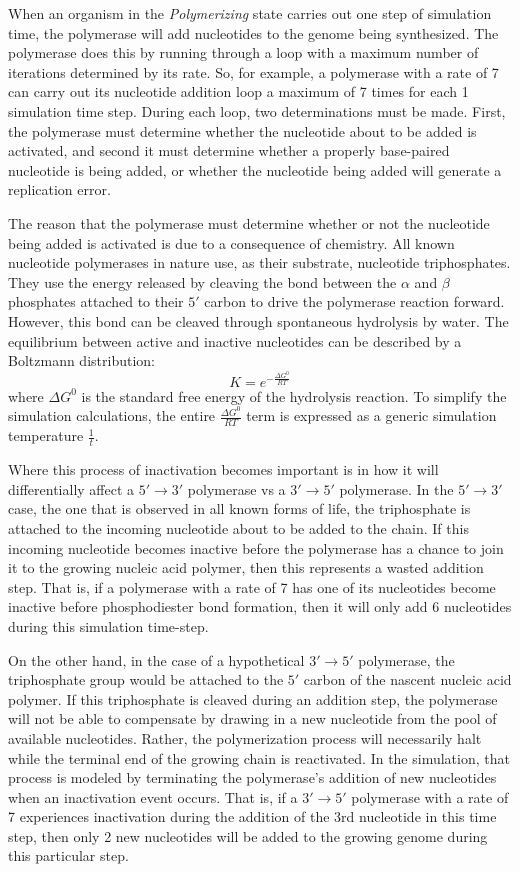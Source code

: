 When an organism in the \emph{Polymerizing} state carries out one step of simulation time, the polymerase will add nucleotides to the genome being synthesized. The polymerase does this by running through a loop with a maximum number of iterations determined by its rate. So, for example, a polymerase with a rate of 7 can carry out its nucleotide addition loop a maximum of 7 times for each 1 simulation time step. During each loop, two determinations must be made. First, the polymerase must determine whether the nucleotide about to be added is activated, and second it must determine whether a properly base-paired nucleotide is being added, or whether the nucleotide being added will generate a replication error.

The reason that the polymerase must determine whether or not the nucleotide being added is activated is due to a consequence of chemistry. All known nucleotide polymerases in nature use, as their substrate, nucleotide triphosphates. They use the energy released by cleaving the bond between the $\alpha$ and $\beta$ phosphates attached to their $5'$ carbon to drive the polymerase reaction forward. However, this bond can be cleaved through spontaneous hydrolysis by water. The equilibrium between active and inactive nucleotides can be described by a Boltzmann distribution:\[
	K = e^{-\frac{\Delta G^0}{RT}}
\]
where $\Delta G^0$ is the standard free energy of the hydrolysis reaction. To simplify the simulation calculations, the entire $\frac{\Delta G^0}{RT}$ term is expressed as a generic simulation temperature $\frac{1}{t}$.

Where this process of inactivation becomes important is in how it will differentially affect a $5'\to3'$ polymerase vs a $3'\to5'$ polymerase. In the $5'\to3'$ case, the one that is observed in all known forms of life, the triphosphate is attached to the incoming nucleotide about to be added to the chain. If this incoming nucleotide becomes inactive before the polymerase has a chance to join it to the growing nucleic acid polymer, then this represents a wasted addition step. That is, if a polymerase with a rate of 7 has one of its nucleotides become inactive before phosphodiester bond formation, then it will only add 6 nucleotides during this simulation time-step.

On the other hand, in the case of a hypothetical $3'\to5'$ polymerase, the triphosphate group would be attached to the $5'$ carbon of the nascent nucleic acid polymer. If this triphosphate is cleaved during an addition step, the polymerase will not be able to compensate by drawing in a new nucleotide from the pool of available nucleotides. Rather, the polymerization process will necessarily halt while the terminal end of the growing chain is reactivated. In the simulation, that process is modeled by terminating the polymerase's addition of new nucleotides when an inactivation event occurs. That is, if a $3'\to5'$ polymerase with a rate of 7 experiences inactivation during the addition of the 3rd nucleotide in this time step, then only 2 new nucleotides will be added to the growing genome during this particular step.

